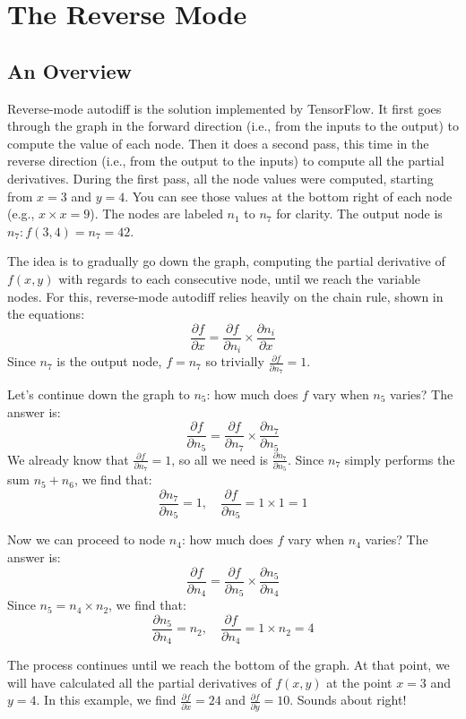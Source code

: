 \section*{The Reverse Mode}

\subsection*{An Overview}
Reverse-mode autodiff is the solution implemented by TensorFlow. It first goes through the graph in the forward direction (i.e., from the inputs to the output) to compute the value of each node. Then it does a second pass, this time in the reverse direction (i.e., from the output to the inputs) to compute all the partial derivatives. During the first pass, all the node values were computed, starting from \(x = 3\) and \(y = 4\). You can see those values at the bottom right of each node (e.g., \(x \times x = 9\)). The nodes are labeled \(n_1\) to \(n_7\) for clarity. The output node is \(n_7: f(3,4) = n_7 = 42\).

The idea is to gradually go down the graph, computing the partial derivative of \(f(x,y)\) with regards to each consecutive node, until we reach the variable nodes. For this, reverse-mode autodiff relies heavily on the chain rule, shown in the equations:
\[
\frac{\partial f}{\partial x} = \frac{\partial f}{\partial n_i} \times \frac{\partial n_i}{\partial x}
\]
Since \(n_7\) is the output node, \(f = n_7\) so trivially \(\frac{\partial f}{\partial n_7} = 1\).

Let’s continue down the graph to \(n_5\): how much does \(f\) vary when \(n_5\) varies? The answer is:
\[
\frac{\partial f}{\partial n_5} = \frac{\partial f}{\partial n_7} \times \frac{\partial n_7}{\partial n_5}
\]
We already know that \(\frac{\partial f}{\partial n_7} = 1\), so all we need is \(\frac{\partial n_7}{\partial n_5}\). Since \(n_7\) simply performs the sum \(n_5 + n_6\), we find that:
\[
\frac{\partial n_7}{\partial n_5} = 1, \quad \frac{\partial f}{\partial n_5} = 1 \times 1 = 1
\]

Now we can proceed to node \(n_4\): how much does \(f\) vary when \(n_4\) varies? The answer is:
\[
\frac{\partial f}{\partial n_4} = \frac{\partial f}{\partial n_5} \times \frac{\partial n_5}{\partial n_4}
\]
Since \(n_5 = n_4 \times n_2\), we find that:
\[
\frac{\partial n_5}{\partial n_4} = n_2, \quad \frac{\partial f}{\partial n_4} = 1 \times n_2 = 4
\]

The process continues until we reach the bottom of the graph. At that point, we will have calculated all the partial derivatives of \(f(x,y)\) at the point \(x = 3\) and \(y = 4\). In this example, we find \(\frac{\partial f}{\partial x} = 24\) and \(\frac{\partial f}{\partial y} = 10\). Sounds about right!

